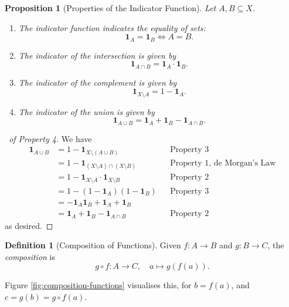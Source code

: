 \documentclass{article}
\newtheorem{proposition}[theorem]{Proposition}
\theoremstyle{definition}
\newtheorem{definition}[theorem]{Definition}
\theoremstyle{remark}
\newcommand{\pqty}[1]{\left(#1\right)}
\newcommand{\functiondomain}[3]{#1:#2\to #3}
\newcommand{\function}[5]{#1:#2\to #3,\quad #4\mapsto #5}
\newcommand{\indicator}{\mathbf{1}}
\begin{document}
\begin{proposition}[Properties of the Indicator Function]
    Let \(A, B \subseteq X\).
    \begin{enumerate}
        \item The indicator function indicates the equality of sets:
        \[
            \indicator_A = \indicator_B \iff A = B.
        \]
        \item The indicator of the intersection is given by
        \[
            \indicator_{A \cap B} = \indicator_A \cdot \indicator_B.
        \]
        \item The indicator of the complement is given by
        \[
            \indicator_{X \setminus A} = 1 - \indicator_{A}.
        \]
        \item The indicator of the union is given by
        \[
            \indicator_{A \cup B} = \indicator_A + \indicator_B - \indicator_{A \cap B}.
        \]
    \end{enumerate}
\end{proposition}

\begin{proof}[\proofname\ of Property 4]
    We have
    \begin{align*}
        \indicator_{A \cup B} &= 1 - \indicator_{X \setminus \pqty{A \cup B}} && \text{Property 3} \\
        &= 1 - \indicator_{\pqty{X \setminus A} \cap \pqty{X \setminus B}} && \text{Property 1, de Morgan's Law} \\
        &= 1 - \indicator_{X \setminus A} \cdot \indicator_{X \setminus B} && \text{Property 2} \\
        &= 1 - \pqty{1 - \indicator_A} \pqty{1 - \indicator_B} && \text{Property 3} \\
        &= - \indicator_A \indicator_B + \indicator_A + \indicator_B \\
        &= \indicator_A + \indicator_B - \indicator_{A \cap B} && \text{Property 2}
    \end{align*}
    as desired.
\end{proof}

\begin{definition}[Composition of Functions]
    Given \(\functiondomain{f}{A}{B}\) and \(\functiondomain{g}{B}{C}\), the \emph{composition} is
    \[
        \function{g \circ f}{A}{C}{a}{g\pqty{f\pqty{a}}.}
    \]
\end{definition}

Figure \autoref{fig:composition-functions} visualises this, for \(b = f\pqty{a}\), and \(c = g\pqty{b} = g \circ f \pqty{a}\).
\end{document}
